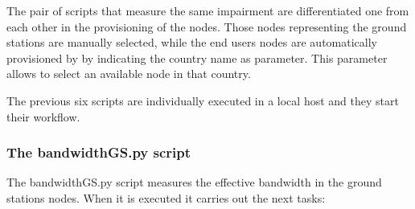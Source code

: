 The pair of scripts that measure the same impairment are differentiated one from each other in the provisioning of the nodes. Those nodes representing the ground stations are manually selected, while the end users nodes are automatically provisioned by \nepi by indicating the country name as parameter. This parameter allows \nepi to select an available node in that country. 

The previous six scripts are individually executed in a local host and they start their workflow.

\subsubsection{The bandwidthGS.py script}

The bandwidthGS.py  script measures the effective bandwidth in the ground
stations nodes. When it is executed it carries out the next tasks:
